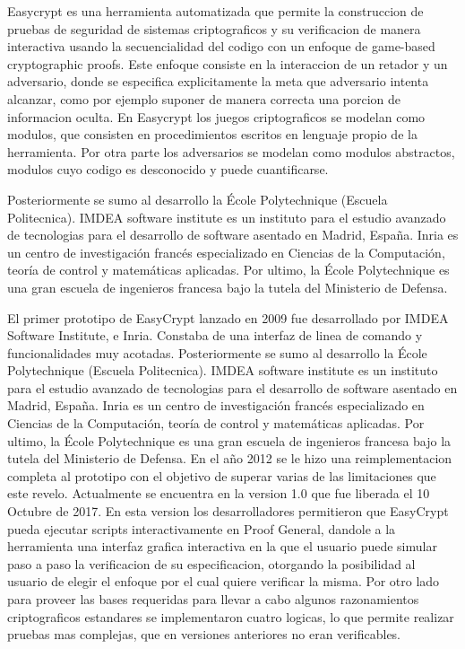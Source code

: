 \documentclass[runningheads]{llncs}
\begin{document}
Easycrypt es una herramienta automatizada que permite la construccion de pruebas de seguridad de sistemas criptograficos y su verificacion de manera interactiva usando la secuencialidad del codigo con un enfoque de game-based cryptographic proofs. Este enfoque consiste en la interaccion de un retador y un adversario, donde se especifica explicitamente la meta que adversario intenta alcanzar, como por ejemplo suponer de manera correcta una porcion de informacion oculta. En Easycrypt los juegos criptograficos se modelan como modulos, que consisten en procedimientos escritos en lenguaje propio de la herramienta. Por otra parte los adversarios se modelan como modulos abstractos, modulos cuyo codigo es desconocido y puede cuantificarse.

 Posteriormente se sumo al desarrollo la École Polytechnique (Escuela Politecnica). IMDEA software institute es un instituto para el estudio avanzado de tecnologias para el desarrollo de software asentado en Madrid, España. Inria es un centro de investigación francés especializado en Ciencias de la Computación, teoría de control y matemáticas aplicadas. Por ultimo, la École Polytechnique es una gran escuela de ingenieros francesa bajo la tutela del Ministerio de Defensa.

El primer prototipo de EasyCrypt lanzado en 2009 fue desarrollado por IMDEA Software Institute, e Inria. Constaba de una interfaz de linea de comando y funcionalidades muy acotadas. Posteriormente se sumo al desarrollo la École Polytechnique (Escuela Politecnica). IMDEA software institute es un instituto para el estudio avanzado de tecnologias para el desarrollo de software asentado en Madrid, España. Inria es un centro de investigación francés especializado en Ciencias de la Computación, teoría de control y matemáticas aplicadas. Por ultimo, la École Polytechnique es una gran escuela de ingenieros francesa bajo la tutela del Ministerio de Defensa. En el año 2012 se le hizo una reimplementacion completa al prototipo con el objetivo de superar varias de las limitaciones que este revelo. Actualmente se encuentra en la version 1.0 que fue liberada el 10 Octubre de 2017. En esta version los desarrolladores permitieron que EasyCrypt pueda ejecutar scripts interactivamente en Proof General\cite{ref_webpage1}, dandole a la herramienta una interfaz grafica interactiva en la que el usuario puede simular paso a paso la verificacion de su especificacion, otorgando la posibilidad al usuario de elegir el enfoque por el cual quiere verificar la misma. Por otro lado para proveer las bases requeridas para llevar a cabo algunos razonamientos criptograficos estandares se implementaron cuatro logicas, lo que permite realizar pruebas mas complejas, que en versiones anteriores no eran verificables.
\end{document}
